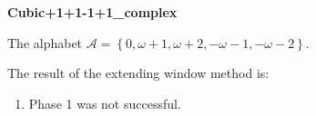 \begin{exmp}
\textbf{ Cubic+1+1-1+1\_complex }

\label{ex:Cubic+1+1-1+1complex}

The alphabet $\mathcal{A} =\left\{0, \omega + 1, \omega + 2, -\omega - 1, -\omega - 2\right\}$.

The result of the extending window method is:
\begin{enumerate}
    \item Phase 1 was not successful. 

\end{enumerate}
\end{exmp}
